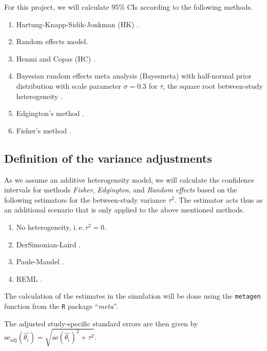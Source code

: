 \documentclass[letterpaper, 12pt]{article}
\newcommand{\ie}{{i.\,e.\,}}
\begin{document}
For this project, we will calculate 95\% CIs according to the following methods.

\begin{enumerate}
  \item Hartung-Knapp-Sidik-Jonkman (HK) \citep{IntHoutIoannidis}.
  \item Random effects model.
  \item Henmi and Copas (HC) \citep{henm:copa:10}.
  \item Bayesian random effects meta analysis (Bayesmeta) with half-normal prior
    distribution with scale parameter $\sigma = 0.3$ for $\tau$, the square root
    between-study heterogeneity  \citep{rov:20, lil:2023}.
  \item Edgington's method \citep{edgington:72}.
  \item Fisher's method \citep{fisher:34}.
\end{enumerate}

\subsection{Definition of the variance adjustments} \label{sec:varadj}

As we assume an additive heterogeneity model, we will calculate the confidence
intervals for methods \emph{Fisher}, \emph{Edgington}, and \emph{Random effects}
based on the following estimators for the between-study variance $\tau^2$. The
estimator acts thus as an additional scenario that is only applied to the above
mentioned methods.

\begin{enumerate}
  \item No heterogeneity, \ie $\tau^2 = 0$.
  \item DerSimonian-Laird \citep{ders:lair:86}.
  \item Paule-Mandel \citep{paul:man:82}.
  \item REML \citep{harv:77}.
\end{enumerate}

The calculation of the estimates in the simulation will be done using the
\texttt{metagen} function from the \texttt{R} package ``\emph{meta}''.

The adjusted study-specific standard errors are then given by
$\text{se}_{\text{adj}}(\hat{\theta_i}) = \sqrt{\text{se}(\hat{\theta_i})^2 + \tau^2}$.

\end{document}

